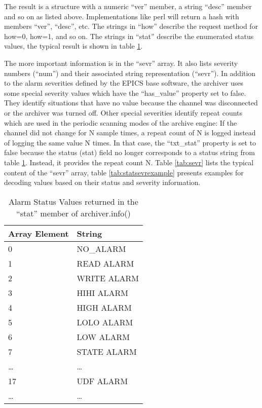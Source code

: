 \noindent The result is a structure with a numeric ``ver''
member, a string ``desc'' member and so on as listed above.
Implementations like perl will return a hash with members
``ver'', ``desc'', etc.
The strings in ``how'' describe the request method for how=0, how=1,
and so on.
The strings in ``stat'' describe the enumerated status values, the
typical result is shown in table \ref{tab:stat}.

The more important information is in the ``sevr'' array.
It also lists severity numbers (``num'') and their associated string
representation (``sevr''). In addition to the alarm severities defined
by the EPICS base software, the archiver uses some special severity
values which have the ``has\_value'' property set to false. They
identify situations that have no value because the channel
was disconnected or the archiver was turned off. Other special
severities identify repeat counts which are used in the periodic
scanning modes of the archive engine: If the channel did not change
for N sample times, a repeat count of N is logged instead of logging
the same value N times. In that case, the ``txt\_stat'' property is
set to false because the status (stat) field no longer corresponds to
a status string from table \ref{tab:stat}. Instead, it provides the
repeat count N.
Table \ref{tab:sevr} lists the typical content of the ``sevr'' array,
table \ref{tab:statsevrexample} presents examples for decoding values
based on their status and severity information.

\begin{table}[htbp]
  \begin{center}
    \sffamily
    \begin{tabular}[t]{l|l}
    Array Element & String \\
    \hline
      0   & NO\_ALARM   \\
      1   & READ ALARM   \\
      2   & WRITE ALARM \\
      3   & HIHI ALARM  \\
      4   & HIGH ALARM  \\
      5   & LOLO ALARM  \\
      6   & LOW ALARM  \\
      7   & STATE ALARM  \\
      \ldots   & \ldots  \\
      17   & UDF ALARM  \\
      \ldots   & \ldots  \\
    \end{tabular}
    \caption{Alarm Status Values returned in the ``stat'' member of archiver.info()}
    \label{tab:stat}
  \end{center}
\end{table}

